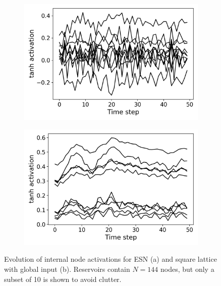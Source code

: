 \begin{figure}[t]
  \centering
  \begin{subfigure}{.49\textwidth}
    \centering
    \includegraphics[width=1.0\linewidth]{figures/esn-activations.png}
    \caption{}
    \label{fig:activations-a}
  \end{subfigure}
  \begin{subfigure}{.49\textwidth}
    \centering
    \includegraphics[width=1.0\linewidth]{figures/sq-activations.png}
    \caption{}
    \label{fig:activations-b}
  \end{subfigure}
  \caption{
    Evolution of internal node activations for ESN (a) and square lattice with
global input (b). Reservoirs contain $N = 144$ nodes, but only a subset of 10 is
shown to avoid clutter.
  }
  \label{fig:activations}
\end{figure}

